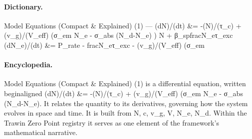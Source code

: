 \paragraph{Dictionary.}
Model Equations (Compact \& Explained) (1) — (dN)/(dt) \&= -(N)/(τ\_c) + (v\_g)/(V\_eff) (σ\_em N\_e - σ\_abs (N\_d-N\_e) ) N + β\_spfracN\_eτ\_exc (dN\_e)/(dt) \&= P\_rate - fracN\_eτ\_exc - (v\_g)/(V\_eff) (σ\_em

\paragraph{Encyclopedia.}
Model Equations (Compact \& Explained) (1) is a differential equation, written beginaligned (dN)/(dt) \&= -(N)/(τ\_c) + (v\_g)/(V\_eff) (σ\_em N\_e - σ\_abs (N\_d-N\_e). It relates the quantity to its derivatives, governing how the system evolves in space and time. It is built from N, c, v\_g, V, N\_e, N\_d. Within the Trawin Zero Point registry it serves as one element of the framework's mathematical narrative.
